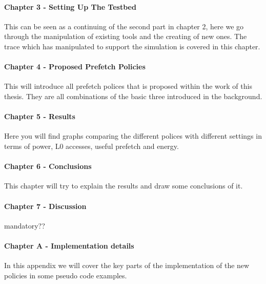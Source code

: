 \paragraph{Chapter 3 - Setting Up The Testbed} This can be seen as a continuing of the
second part in chapter 2, here we go through the manipulation of existing tools and
the creating of new ones. The trace which has manipulated to support the simulation
is covered in this chapter.
\paragraph{Chapter 4 - Proposed Prefetch Policies} This will introduce all prefetch polices
that is proposed within the work of this thesis. They are all combinations of the basic
three introduced in the background.
\paragraph{Chapter 5 - Results} Here you will find graphs comparing the different polices
with different settings in terms of power, L0 accesses, useful prefetch and energy.
\paragraph{Chapter 6 - Conclusions} This chapter will try to explain the results and draw
some conclusions of it.
\paragraph{Chapter 7 - Discussion} mandatory??
\paragraph{Chapter A - Implementation details} In this appendix we will cover the key
parts of the implementation of the new policies in some pseudo code examples.